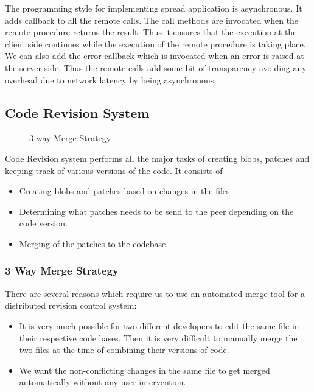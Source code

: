 \documentclass[12pt]{article}
\begin{document}
The programming style for implementing spread application is asynchronous. It
adds callback to all the remote calls. The call methods are invocated when the
remote procedure returns the result. Thus it ensures that the execution at the
client side continues while the execution of the remote procedure is taking
place. We can also add the error callback which is invocated when an error is
raised at the server side. Thus the remote calls add some bit of transparency
avoiding any overhead due to network latency by being asynchronous.


\subsection{Code Revision System}
\begin{wrapfigure}[8]{r}{9cm}
\centering
{}
\caption{3-way Merge Strategy}
\end{wrapfigure}
Code Revision system performs all the major tasks of creating blobs, patches and
keeping track of various versions of the code. It consists of
\begin{itemize}
\item Creating blobs and patches based on changes in the files.
\item Determining what patches needs to be send to the peer depending on the
  code version.
\item Merging of the patches to the codebase.
\end{itemize}
\subsubsection{3 Way  Merge Strategy}
There are several reasons which require us to use an automated merge tool for a distributed revision control system:
\begin{itemize}
\item It is very much possible for two different developers to edit the same file in their respective code bases. Then it is very difficult to manually merge the two files at the time of combining their versions of code.
\item We want the non-conflicting changes in the same file to get merged automatically without any user intervention.
\end{itemize}
\end{document}
